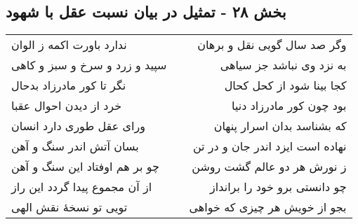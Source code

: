 \begin{center}
\section*{بخش ۲۸ - تمثیل در بیان نسبت عقل با شهود}
\label{sec:sh028}
\begin{longtable}{l p{0.5cm} r}
ندارد باورت اکمه ز الوان
&&
وگر صد سال گویی نقل و برهان
\\
سپید و زرد و سرخ و سبز و کاهی
&&
به نزد وی نباشد جز سیاهی
\\
نگر تا کور مادرزاد بدحال
&&
کجا بینا شود از کحل کحال
\\
خرد از دیدن احوال عقبا
&&
بود چون کور مادرزاد دنیا
\\
ورای عقل طوری دارد انسان
&&
که بشناسد بدان اسرار پنهان
\\
بسان آتش اندر سنگ و آهن
&&
نهاده است ایزد اندر جان و در تن
\\
چو بر هم اوفتاد این سنگ و آهن
&&
ز نورش هر دو عالم گشت روشن
\\
از آن مجموع پیدا گردد این راز
&&
چو دانستی برو خود را برانداز
\\
تویی تو نسخهٔ نقش الهی
&&
بجو از خویش هر چیزی که خواهی
\\
\end{longtable}
\end{center}
